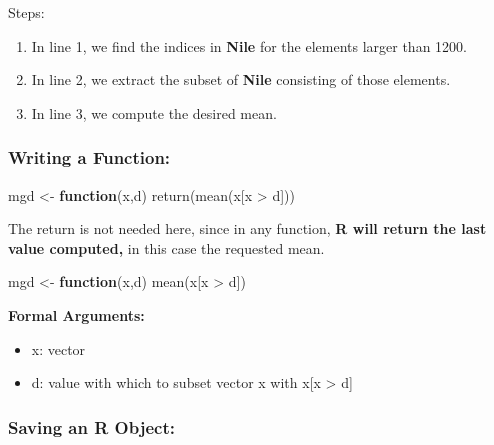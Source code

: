 \documentclass[
]{article}
\newenvironment{Shaded}{\begin{snugshade}}{\end{snugshade}}
\newcommand{\ControlFlowTok}[1]{\textcolor[rgb]{0.13,0.29,0.53}{\textbf{#1}}}
\newcommand{\FunctionTok}[1]{\textcolor[rgb]{0.00,0.00,0.00}{#1}}
\newcommand{\NormalTok}[1]{#1}
\newcommand{\OtherTok}[1]{\textcolor[rgb]{0.56,0.35,0.01}{#1}}
\newcommand{\SpecialCharTok}[1]{\textcolor[rgb]{0.00,0.00,0.00}{#1}}
\providecommand{\tightlist}{%
  \setlength{\itemsep}{0pt}\setlength{\parskip}{0pt}}
\begin{document}
Steps:

\begin{enumerate}
\def\labelenumi{\arabic{enumi}.}
\tightlist
\item
  In line 1, we find the indices in \textbf{Nile} for the elements
  larger than 1200.
\item
  In line 2, we extract the subset of \textbf{Nile} consisting of those
  elements.
\item
  In line 3, we compute the desired mean.
\end{enumerate}

\hypertarget{writing-a-function}{%
\subsubsection{Writing a Function:}\label{writing-a-function}}

\begin{Shaded}
\begin{Highlighting}[]
\NormalTok{mgd }\OtherTok{\textless{}{-}} \ControlFlowTok{function}\NormalTok{(x,d) }\FunctionTok{return}\NormalTok{(}\FunctionTok{mean}\NormalTok{(x[x }\SpecialCharTok{\textgreater{}}\NormalTok{ d]))}
\end{Highlighting}
\end{Shaded}

The return is not needed here, since in any function, \textbf{R will
return the last value computed,} in this case the requested mean.

\begin{Shaded}
\begin{Highlighting}[]
\NormalTok{mgd }\OtherTok{\textless{}{-}} \ControlFlowTok{function}\NormalTok{(x,d) }\FunctionTok{mean}\NormalTok{(x[x }\SpecialCharTok{\textgreater{}}\NormalTok{ d])}
\end{Highlighting}
\end{Shaded}

\textbf{Formal Arguments:}

\begin{itemize}
\item
  x: vector
\item
  d: value with which to subset vector x with x{[}x \textgreater{} d{]}
\end{itemize}

\hypertarget{saving-an-r-object}{%
\subsubsection{Saving an R Object:}\label{saving-an-r-object}}
\end{document}
